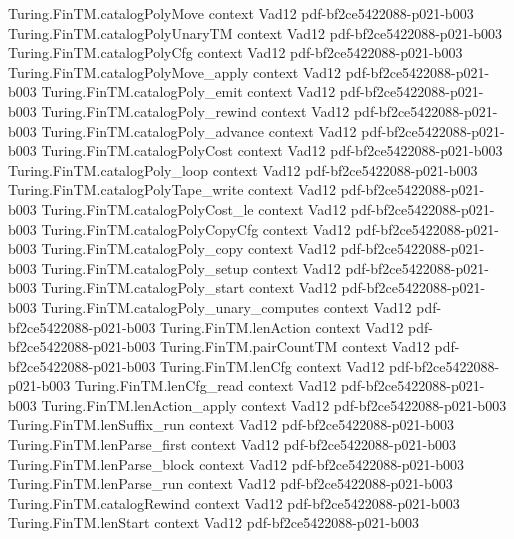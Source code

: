 \begin{theorem}
  {Turing.FinTM.catalogPolyMove}
  {context}
  {Vad12}
  {pdf-bf2ce5422088-p021-b003}
\proofstep
  {Turing.FinTM.catalogPolyUnaryTM}
  {context}
  {Vad12}
  {pdf-bf2ce5422088-p021-b003}
\proofstep
  {Turing.FinTM.catalogPolyCfg}
  {context}
  {Vad12}
  {pdf-bf2ce5422088-p021-b003}
\proofstep
  {Turing.FinTM.catalogPolyMove_apply}
  {context}
  {Vad12}
  {pdf-bf2ce5422088-p021-b003}
\proofstep
  {Turing.FinTM.catalogPoly_emit}
  {context}
  {Vad12}
  {pdf-bf2ce5422088-p021-b003}
\proofstep
  {Turing.FinTM.catalogPoly_rewind}
  {context}
  {Vad12}
  {pdf-bf2ce5422088-p021-b003}
\proofstep
  {Turing.FinTM.catalogPoly_advance}
  {context}
  {Vad12}
  {pdf-bf2ce5422088-p021-b003}
\proofstep
  {Turing.FinTM.catalogPolyCost}
  {context}
  {Vad12}
  {pdf-bf2ce5422088-p021-b003}
\proofstep
  {Turing.FinTM.catalogPoly_loop}
  {context}
  {Vad12}
  {pdf-bf2ce5422088-p021-b003}
\proofstep
  {Turing.FinTM.catalogPolyTape_write}
  {context}
  {Vad12}
  {pdf-bf2ce5422088-p021-b003}
\proofstep
  {Turing.FinTM.catalogPolyCost_le}
  {context}
  {Vad12}
  {pdf-bf2ce5422088-p021-b003}
\proofstep
  {Turing.FinTM.catalogPolyCopyCfg}
  {context}
  {Vad12}
  {pdf-bf2ce5422088-p021-b003}
\proofstep
  {Turing.FinTM.catalogPoly_copy}
  {context}
  {Vad12}
  {pdf-bf2ce5422088-p021-b003}
\proofstep
  {Turing.FinTM.catalogPoly_setup}
  {context}
  {Vad12}
  {pdf-bf2ce5422088-p021-b003}
\proofstep
  {Turing.FinTM.catalogPoly_start}
  {context}
  {Vad12}
  {pdf-bf2ce5422088-p021-b003}
\proofstep
  {Turing.FinTM.catalogPoly_unary_computes}
  {context}
  {Vad12}
  {pdf-bf2ce5422088-p021-b003}
\proofstep
  {Turing.FinTM.lenAction}
  {context}
  {Vad12}
  {pdf-bf2ce5422088-p021-b003}
\proofstep
  {Turing.FinTM.pairCountTM}
  {context}
  {Vad12}
  {pdf-bf2ce5422088-p021-b003}
\proofstep
  {Turing.FinTM.lenCfg}
  {context}
  {Vad12}
  {pdf-bf2ce5422088-p021-b003}
\proofstep
  {Turing.FinTM.lenCfg_read}
  {context}
  {Vad12}
  {pdf-bf2ce5422088-p021-b003}
\proofstep
  {Turing.FinTM.lenAction_apply}
  {context}
  {Vad12}
  {pdf-bf2ce5422088-p021-b003}
\proofstep
  {Turing.FinTM.lenSuffix_run}
  {context}
  {Vad12}
  {pdf-bf2ce5422088-p021-b003}
\proofstep
  {Turing.FinTM.lenParse_first}
  {context}
  {Vad12}
  {pdf-bf2ce5422088-p021-b003}
\proofstep
  {Turing.FinTM.lenParse_block}
  {context}
  {Vad12}
  {pdf-bf2ce5422088-p021-b003}
\proofstep
  {Turing.FinTM.lenParse_run}
  {context}
  {Vad12}
  {pdf-bf2ce5422088-p021-b003}
\proofstep
  {Turing.FinTM.catalogRewind}
  {context}
  {Vad12}
  {pdf-bf2ce5422088-p021-b003}
\proofstep
  {Turing.FinTM.lenStart}
  {context}
  {Vad12}
  {pdf-bf2ce5422088-p021-b003}

\end{theorem}
